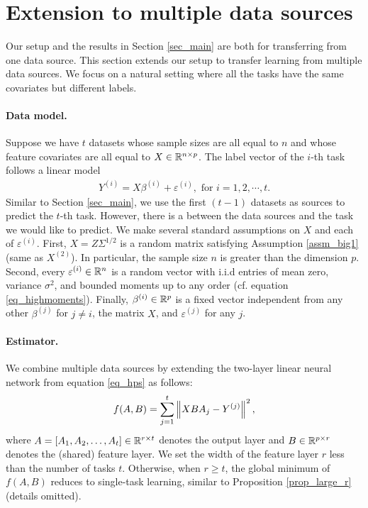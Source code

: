 \section{Extension to multiple data sources}\label{sec_same}

Our setup and the results in Section \ref{sec_main} are both for transferring from one data source.
This section extends our setup to transfer learning from multiple data sources.
We focus on a natural setting where all the tasks have the same covariates but different labels.

\paragraph{Data model.} Suppose we have $t$ datasets whose sample sizes are all equal to $n$ and whose feature covariates are all equal to $X \in \mathbb{R}^{n \times p}$. The label vector of the $i$-th task follows a linear model
\begin{align}\label{eq_mtl_data}
    Y^{(i)} = X \beta^{(i)} + \varepsilon^{(i)}, \text{ for } i=1, 2,\cdots, t.
\end{align}
Similar to Section \ref{sec_main}, we use the first $(t-1)$ datasets as sources to predict the $t$-th task.
However, there is a  between the data sources and the task we would like to predict.
We make several standard assumptions on $X$ and each of $\varepsilon^{(i)}$.
First, $X = Z\Sigma^{1/2}$ is a random matrix satisfying Assumption \ref{assm_big1} (same as $X^{(2)}$).
In particular, the sample size $n$ is greater than the dimension $p$.
Second, every $\varepsilon^{(i)} \in \mathbb{R}^{n}$ is a random vector with i.i.d entries of mean zero, variance $\sigma^2$, and bounded moments up to any order (cf. equation \eqref{eq_highmoments}).
Finally, $\beta^{(i)} \in \mathbb{R}^{p}$ is a fixed vector independent from any other $\beta^{(j)}$ for $j \neq i$, the matrix $X$, and $\varepsilon^{(j)}$ for any $j$.

\paragraph{Estimator.} We combine multiple data sources by extending the two-layer linear neural network from equation \eqref{eq_hps} as follows:
\begin{align}
	f(A, B) = \sum_{j=1}^t \bignorm{X B A_j - Y^{(j)}}^2, \label{eq_mtl_same_cov}
\end{align}
where $A = [A_1, A_2, \dots, A_t] \in \mathbb{R}^{r \times t}$ denotes the output layer and $B \in \mathbb{R}^{p \times r}$ denotes the (shared) feature layer.
We set the width of the feature layer $r$ less than the number of tasks $t$.
Otherwise, when $r \ge t$, the global minimum of $f(A, B)$ reduces to single-task learning, similar to Proposition \ref{prop_large_r} (details omitted).

